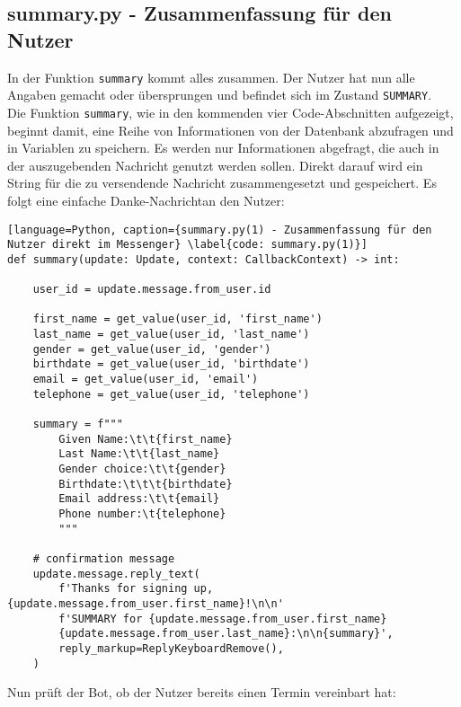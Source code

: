         \subsection{summary.py - Zusammenfassung für den Nutzer} \label{Implementierung: summary.py}
            In der Funktion \verb|summary| kommt alles zusammen. Der Nutzer hat nun alle Angaben gemacht oder übersprungen und befindet sich im Zustand \verb|SUMMARY|. \\
            Die Funktion \verb|summary|, wie in den kommenden vier Code-Abschnitten aufgezeigt, beginnt damit, eine Reihe von Informationen von der Datenbank abzufragen und in Variablen zu speichern. Es werden nur Informationen abgefragt, die auch in der auszugebenden Nachricht genutzt werden sollen. Direkt darauf wird ein String für die zu versendende Nachricht zusammengesetzt und gespeichert. Es folgt eine einfache \glqq Danke-Nachricht\grqq an den Nutzer:

            \begin{lstlisting}[language=Python, caption={summary.py(1) - Zusammenfassung für den Nutzer direkt im Messenger} \label{code: summary.py(1)}]
def summary(update: Update, context: CallbackContext) -> int:
    
    user_id = update.message.from_user.id    

    first_name = get_value(user_id, 'first_name')
    last_name = get_value(user_id, 'last_name')
    gender = get_value(user_id, 'gender')
    birthdate = get_value(user_id, 'birthdate')
    email = get_value(user_id, 'email')
    telephone = get_value(user_id, 'telephone')

    summary = f"""
        Given Name:\t\t{first_name}
        Last Name:\t\t{last_name}
        Gender choice:\t\t{gender}
        Birthdate:\t\t\t{birthdate}
        Email address:\t\t{email}
        Phone number:\t{telephone}
        """

    # confirmation message
    update.message.reply_text(
        f'Thanks for signing up, {update.message.from_user.first_name}!\n\n'
        f'SUMMARY for {update.message.from_user.first_name} 
        {update.message.from_user.last_name}:\n\n{summary}',
        reply_markup=ReplyKeyboardRemove(),
    )
            \end{lstlisting}
            Nun prüft der Bot, ob der Nutzer bereits einen Termin vereinbart hat:
            
